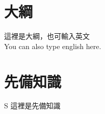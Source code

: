 \documentclass[book, oneside, 12pt]{article}
\begin{document}
\begin{CJK*}{UTF8}{bsmi} %
	
	\section{大綱}
	這裡是大綱，也可輸入英文 \\
	You can also type english here.
	
	\section{先備知識}S
	這裡是先備知識
	
\end{CJK*}
\end{document}
